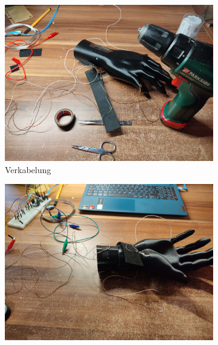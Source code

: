 \documentclass[11pt, a4paper]{article}
\begin{document}
\begin{figure}[h]
	\begin{subfigure}[c]{0.3\textwidth}
		\includegraphics[scale=.037]{assets/Drill_markers.jpg}
		\caption{Verkabelung}
		\label{fig:Initial_drawing4}
	\end{subfigure}
	\begin{subfigure}[c]{0.3\textwidth}
		\includegraphics[scale=.037]{assets/Testing_before_finalizing.jpg}
		\label{fig:Initial_drawing5}
	\end{subfigure}
		\begin{subfigure}[c]{0.3\textwidth}

\end{subfigure}
\end{figure}
\end{document}
